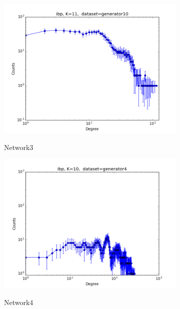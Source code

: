 \begin{figure}[h]
        \begin{subfigure}[b]{0.300\textwidth}
            \centering
            \includegraphics[width=\textwidth]{img/expe/3_ibp/figure_1}
            \label{fig:mean and std of net14}
            \caption {{\small Network3}}    
        \end{subfigure}
        \begin{subfigure}[b]{0.300\textwidth}
            \centering
            \includegraphics[width=\textwidth]{img/expe/4_ibp/figure_1}
            \label{fig:mean and std of net14}
            \caption {{\small Network4}}    
        \end{subfigure}
        \begin{subfigure}[b]{0.300\textwidth}

\end{subfigure}
\end{figure}
